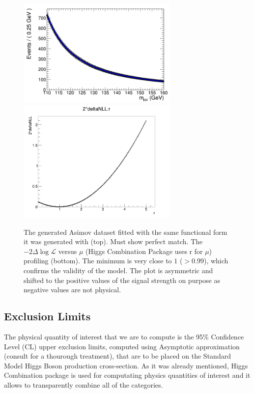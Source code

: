 \begin{figure}[hbp]
     \centering
     \includegraphics[width=0.7\textwidth]{figures/combine/asimovTests/cat6_x_fit_b.png}\\
     \includegraphics[width=0.7\textwidth]{figures/combine/asimovTests/NLL_asimovTest_p25GeV.png}
     \caption{The generated Asimov dataset fitted with the same functional form it was generated with (top). Must show perfect match. The $-2\Delta\log{\mathcal{L}}$ versus $\mu$ (Higgs Combination Package uses r for $\mu$) profiling (bottom). The minimum is very close to $1$ ($> 0.99$), which confirms the validity of the model. The plot is asymmetric and shifted to the positive values of the signal strength on purpose as negative values are not physical.}
     \label{fig:higgs_combination_asimovtests}
 \end{figure}

\subsection{Exclusion Limits}
The physical quantity of interest that we are to compute is the 95\% Confidence Level (CL) upper exclusion limits, computed using Asymptotic approximation (consult \cite{} for a thourough treatment), that are to be placed on the Standard Model Higgs Boson production cross-section. As it was already mentioned, Higgs Combination package is used for computating physics quantities of interest and it allows to transparently combine all of the categories.

